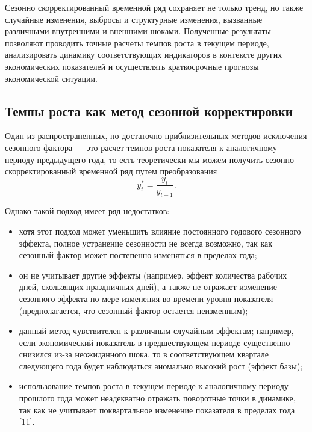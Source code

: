 \documentclass[a4paper, 14pt]{extreport}
\numberwithin{equation}{subsection}
\numberwithin{equation}{section}
\begin{document}
	Сезонно скорректированный временной ряд сохраняет не только тренд, но также случайные изменения, выбросы и структурные изменения, вызванные различными внутренними и внешними шоками. Полученные результаты позволяют проводить точные расчеты темпов роста в текущем периоде, анализировать динамику соответствующих индикаторов в контексте других экономических показателей и осуществлять краткосрочные прогнозы экономической ситуации.
	\subsection{Темпы роста как метод сезонной корректировки}
	Один из распространенных, но достаточно приблизительных методов исключения сезонного фактора --- это расчет темпов роста показателя к аналогичному периоду предыдущего года, то есть теоретически мы можем получить сезонно скорректированный временной ряд путем преобразования
	\begin{equation}
		y^*_t = \dfrac{y_t}{y_{t-1}}.
		\label{greq}
	\end{equation}
 	
 	Однако такой подход имеет ряд недостатков:
 	\begin{itemize}
 		\item хотя этот подход может уменьшить влияние постоянного годового сезонного эффекта, полное устранение сезонности не всегда возможно, так как сезонный фактор может постепенно изменяться в пределах года;
 		\item он не учитывает другие эффекты (например, эффект количества рабочих дней, скользящих праздничных дней), а также не отражает изменение сезонного эффекта по мере изменения во времени уровня показателя (предполагается, что сезонный фактор остается неизменным); 
 		\item данный метод чувствителен к различным случайным эффектам; например, если экономический показатель в предшествующем периоде существенно снизился из-за неожиданного шока, то в соответствующем квартале следующего года будет наблюдаться аномально высокий рост (эффект базы);
 		\item использование темпов роста в текущем периоде к аналогичному периоду прошлого года может неадекватно отражать поворотные точки в динамике, так как не учитывает поквартальное изменение показателя в пределах года [11].
 	\end{itemize} 
\end{document}
